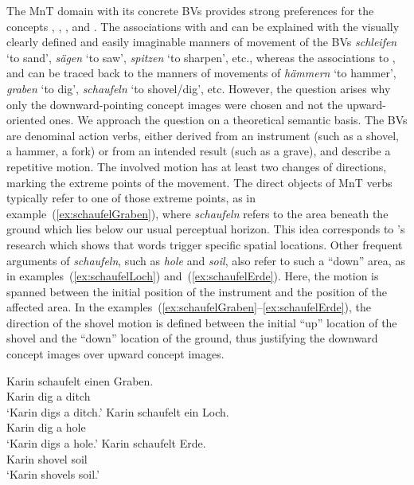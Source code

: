 \documentclass[output=paper]{langsci/langscibook}
\begin{document}
The MnT domain with its concrete BVs provides strong
preferences for the concepts ,
, ,  and
. The associations with  and
 can be explained with the visually clearly defined
and easily imaginable manners of movement of the BVs
\textit{schleifen} `to sand', \textit{sägen} `to saw',
\textit{spitzen} `to sharpen', etc., whereas the associations to
,  and  can
be traced back to the manners of movements of \textit{hämmern} `to
hammer', \textit{graben} `to dig', \textit{schaufeln} `to
shovel/dig', etc. However, the question arises why only the
downward-pointing concept images were chosen and not the upward-oriented ones. We
approach the question on a theoretical semantic basis. The BVs are
denominal action verbs, either derived from an instrument (such as a
shovel, a hammer, a fork) or from an intended result (such as a
grave), and describe a repetitive motion. The involved motion has at
least two changes of directions, marking the extreme points of the
movement. The direct objects of MnT verbs typically refer to
one of those extreme points, as in example~(\ref{ex:schaufelGraben}),
where \textit{schaufeln} refers to the area beneath the ground which
lies below our usual perceptual horizon. This idea corresponds to
\cite{LachmairEtAl:16}'s research which shows that words trigger
specific spatial locations. Other frequent arguments of
\textit{schaufeln}, such as \textit{hole} and \textit{soil}, also
refer to such a ``down'' area, as in examples~(\ref{ex:schaufelLoch})
and~(\ref{ex:schaufelErde}). Here, the motion is spanned between the
initial position of the instrument and the position of the affected
area. In the
examples~(\ref{ex:schaufelGraben}--\ref{ex:schaufelErde}), the
direction of the shovel motion is defined between the initial ``up''
location of the shovel and the ``down'' location of the ground, thus
justifying the downward concept images over upward concept images.

\ea\label{ex:schaufelGraben} 
\gll Karin schaufelt einen Graben.\\ 
Karin dig a ditch\\
\glt `Karin digs a ditch.'
\ex \label{ex:schaufelLoch} 
\gll Karin schaufelt ein Loch.\\ 
Karin dig a hole\\
\glt `Karin digs a hole.'
\ex \label{ex:schaufelErde} 
\gll Karin schaufelt Erde.\\ 
Karin shovel soil\\
\glt `Karin shovels soil.'
\z
\end{document}
